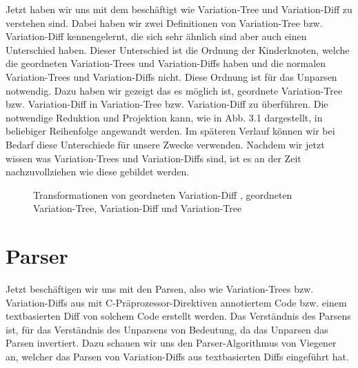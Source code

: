 Jetzt haben wir uns mit dem beschäftigt wie Variation-Tree und Variation-Diff zu verstehen sind. Dabei haben wir zwei Definitionen von Variation-Tree bzw. Variation-Diff kennengelernt, die sich sehr ähnlich sind aber auch einen Unterschied haben. Dieser Unterschied ist die Ordnung der Kinderknoten, welche die geordneten Variation-Trees und Variation-Diffs haben und die normalen Variation-Trees und Variation-Diffs nicht. Diese Ordnung ist für das Unparsen notwendig. Dazu haben wir gezeigt das es möglich ist, geordnete Variation-Tree bzw. Variation-Diff in Variation-Tree bzw. Variation-Diff zu überführen. Die notwendige Reduktion und Projektion kann, wie in Abb. 3.1 dargestellt, in beliebiger Reihenfolge angewandt werden. Im späteren Verlauf können wir bei Bedarf diese Unterschiede für unsere Zwecke verwenden. Nachdem wir jetzt wissen was Variation-Trees und Variation-Diffs sind, ist es an der Zeit nachzuvollziehen wie diese gebildet werden.

\begin{figure}[H]
	\centering
	\caption{Transformationen von geordneten Variation-Diff , geordneten Variation-Tree, Variation-Diff und Variation-Tree}
\end{figure}


\section{Parser}

Jetzt beschäftigen wir uns mit den Parsen, also wie Variation-Trees bzw. Variation-Diffs  aus mit C-Präprozessor-Direktiven annotiertem Code bzw. einem textbasierten Diff von solchem Code erstellt werden. Das Verständnis des Parsens ist, für das Verständnis des Unparsens von Bedeutung, da das Unparsen das Parsen invertiert. Dazu schauen wir uns den Parser-Algorithmus von Viegener~\cite{Viegener21} an, welcher das Parsen von Variation-Diffs aus textbasierten Diffs eingeführt hat.\\


